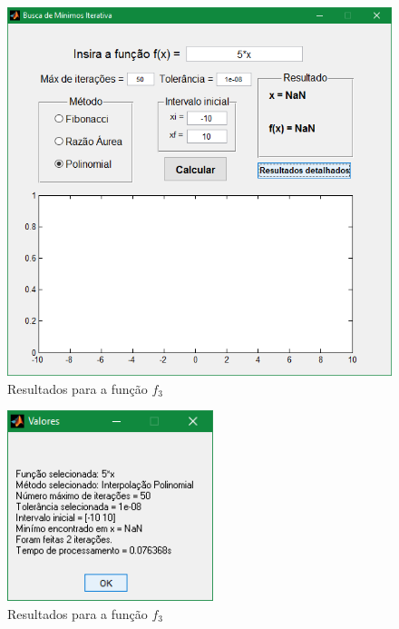 \begin{figure}[H]
	\begin{center}	
		\includegraphics[width=14cm]{../interpol/f3_gui.PNG}
		\caption{Resultados para a função $f_3$}
		\label{fig:f3_gui}
	\end{center}
\end{figure}

\begin{figure}[H]
	\begin{center}	
		\includegraphics[width=6cm]{../interpol/f3_resultados.PNG}
		\caption{Resultados para a função $f_3$}
		\label{fig:f3_resultados}
	\end{center}
\end{figure}



